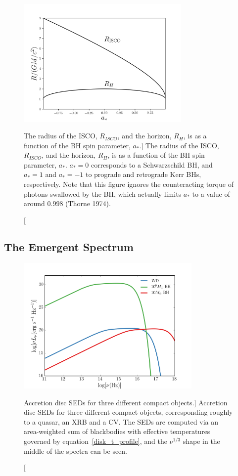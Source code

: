\nocite{narayan2014, thorne1974}
\begin{figure}
\centering
\includegraphics[width=0.75\textwidth]{figures/01-intro/risco.png}
\caption
[The radius of the ISCO, $R_{ISCO}$, and the horizon, $R_H$,
is as a function of the BH spin parameter, $a_*$.]
{
The radius of the ISCO, $R_{ISCO}$, and the horizon, $R_H$,
is as a function of the BH spin parameter, $a_*$. 
$a_*=0$ corresponds to a Schwarzschild BH, and $a_*=1$ and $a_*=-1$
to prograde and retrograde Kerr BHs, respectively. Note that
this figure ignores the counteracting torque of photons swallowed by the BH,
which actually limits $a_*$ to a value of around $0.998$ (Thorne 1974).  
} 
\label{fig:isco}
\end{figure}


\subsection{The Emergent Spectrum}


\begin{figure}
\centering
\includegraphics[width=0.8\textwidth]{figures/01-intro/disc_seds.png}
\caption
[Accretion disc SEDs for three different compact objects.]
{
Accretion disc SEDs for three different compact objects, corresponding roughly
to a quasar, an XRB and a CV. The SEDs are computed via an area-weighted sum
of blackbodies with effective temperatures governed by equation~\ref{disk_t_profile},
and the $\nu^{1/3}$ shape in the middle of the spectra can be seen.
} 
\label{fig:disc_seds}
\end{figure}

